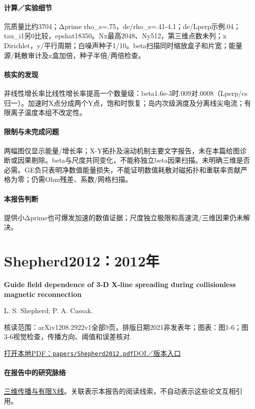 \documentclass[UTF8,a4paper,11pt,openany,fontset=fandol]{ctexbook}
\begin{document}
\paragraph{计算／实验细节}氘质量比约3704；Δprime rho\_s=.75，de/rho\_s=.41-4.1；de/Lperp示例.04；tau\_i1另0比较，epshat18350。Nx最高2048、Ny512，第三维点数未列；x Dirichlet，y/平行周期；白噪声种子1/10。beta扫描同时缩放盒子和片宽；能量源/耗散审计及x盒加倍，种子半倍/两倍检查。

\paragraph{核实的发现}非线性增长率比线性增长率提高一个数量级：beta1.6e-3时.009对.0008（Lperp/cs归一）。加速时X点分成两个Y点，饱和时恢复；岛内次级涡度及分离线尖电流；有限离子温度本组不改定性。

\paragraph{限制与未完成问题}两幅图仅显示能量/增长率；X-Y拓扑及湍动机制主要文字报告，未在本篇给图诊断或因果剔除。beta与尺度共同变化，不能称独立beta因果扫描。未明确三维是否必需。GE负只表明净数值能量损失，不能证明数值耗散对磁拓扑和重联率贡献严格为零；仍需Ohm残差、系数/网格扫描。

\paragraph{本报告判断}提供小Δprime也可爆发加速的数值证据；尺度独立极限和高速流/三维因果仍未解决。

\section{Shepherd2012：2012年}\label{paper:Shepherd2012}

\textbf{Guide field dependence of 3‐D X‐line spreading during collisionless magnetic reconnection}\citep{Shepherd2012}\

L. S. Shepherd;  P. A. Cassak.

\textsf{核读范围：}arXiv1208.2922v1全部9页，排版日期2021非发表年；\textsf{图表：}图1-6；图3-6视觉检查，传播方向、阈值和误差核对.

\href{run:../papers/Shepherd2012.pdf}{打开本地PDF：\texttt{papers/Shepherd2012.pdf}}\quad\href{https://doi.org/10.1029/2012ja017867}{DOI／版本入口}

\paragraph{在报告中的研究脉络}\hyperref[story:three]{三维传播与有限X线}。关联表示本报告的阅读线索，不自动表示这些论文互相引用。
\end{document}
